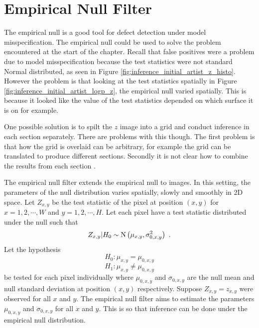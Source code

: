 \section{Empirical Null Filter}

The empirical null is a good tool for defect detection under model misspecification. The empirical null could be used to solve the problem encountered at the start of the chapter. Recall that false positives were a problem due to model misspecification because the test statistics were not standard Normal distributed, as seen in Figure \ref{fig:inference_initial_artist_z_histo}. However the problem is that looking at the test statistics spatially in Figure \ref{fig:inference_initial_artist_logp_z}, the empirical null varied spatially. This is because it looked like the value of the test statistics depended on which surface it is on for example. 

One possible solution is to spilt the $z$ image into a grid and conduct inference in each section separately. There are problems with this though. The first problem is that how the grid is overlaid can be arbitrary, for example the grid can be translated to produce different sections. Secondly it is not clear how to combine the results from each section \citep{efron2008simultaneous}.

The empirical null filter extends the empirical null to images. In this setting, the parameters of the null distribution varies spatially, slowly and smoothly in 2D space. Let $Z_{x,y}$ be the test statistic of the pixel at position $(x,y)$ for $x=1,2,\cdots,W$ and $y=1,2,\cdots,H$. Let each pixel have a test statistic distributed under the null such that
\begin{equation}
  Z_{x,y}|H_0\sim\operatorname{N}\left(
    \mu_{x,y},\sigma_{0,x,y}^2
  \right)
  \ .
\end{equation}
Let the hypothesis
\begin{equation}
  H_0:\mu_{x,y}=\mu_{0,x,y}
\end{equation}
\begin{equation}
  H_1:\mu_{x,y}\neq\mu_{0,x,y}
\end{equation}
be tested for each pixel individually where $\mu_{0,x,y}$ and $\sigma_{0,x,y}$ are the null mean and null standard deviation at position $(x,y)$ respectively. Suppose $Z_{x,y}=z_{x,y}$ were observed for all $x$ and $y$. The empirical null filter aims to estimate the parameters $\mu_{0,x,y}$ and $\sigma_{0,x,y}$ for all $x$ and $y$. This is so that inference can be done under the empirical null distribution. 

